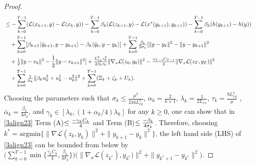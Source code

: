 \documentclass[letterpaper,11 pt]{article}
\def\ml{\mathcal L}
\newcommand{\zal}[1]{{\color{black}#1}}
\newcommand{\af}[1]{{\color{black}#1}}
\newcommand{\mb}[1]{{\color{black}#1}}
\newcommand{\az}[1]{{\color{black}#1}}
\begin{document}
\begin{proof}
\begin{align}
\nonumber&\leq -\sum_{k=0}^{T-1}(\ml(x_{k+1},y)-\ml(x_{k},y))- \sum_{k=0}^{T-1}\beta_k(\ml(z_{k+1},y)-\ml(x^\ast\zal{(y_{k+1})},y_{k+1}))- \sum_{k=0}^{T-1}\beta_k(h(y_{k+1})-h(y))\\
\nonumber&\quad +\sum_{k=0}^{T-1}[\beta_{k+1}\langle \bar q_{k+1},y-y_{k+1}\rangle-\beta_k\langle \bar q_k,y-y_k\rangle] +\sum_{k=0}^{T-1}\tfrac{\beta_k}{ 2\sigma_k}[\|y-y_k\|^2-\|y-y_{k+1}\|^2\\
\nonumber&\quad+\tfrac{1}{ 2}\|y-v_k\|^2-\frac{1}{2}\|y-v_{k+1}\|^2]+\tfrac{L_{xy}^2\gamma_0^2}{ 2\beta_0\tau_0}\|\nabla_x\ml{(z_0,y_0)}\|^2-\tfrac{\gamma_{T-1}C_{T-1}}{ 2}\|\nabla_x \ml (z_{T},y_T)\|^2\\
&\quad+\af{\sum_{k=0}^{T-1}\tfrac{1}{ \bar\alpha_k}\|\beta_ku_k^3+u_k^1-u_k^2\|^2}+\mb{\sum_{k=0}^{T-1}(\Xi_k+\zeta_k+U_k)}.
\end{align}
Choosing the parameters such that \az{$\sigma_k \leq\tfrac{\mu^2}{216L^2_{xy}}$}, $\alpha_k=\tfrac{2}{k+1}$, $\lambda_k=\tfrac{1}{2L_{xx}}$, $\tau_k=\tfrac{9L^2_{xy}}{\mu}$ , $\bar\alpha_k=\tfrac{\beta_k}{4\sigma_k}$, and $\gamma_k\in [\lambda_k,(1+\alpha_k/4)\lambda_k]$ for any $k\geq 0$, one can show that in \eqref{3align23} Term (A)$\leq{-{\gamma_k C_k}\over4}$ and Term (B)$\leq {-\beta_k\over{4\sigma_k}}$. Therefore, choosing $k^*=\mbox{argmin}\{\|\nabla \ml (z_{k},y_{k})\|^2+\|y_{k+1}-y_{k}\|^2\}$, the left hand side (LHS) of \eqref{3align23} can be bounded from below by $\big(\sum_{k=0}^{T-1} \min \{{\tfrac{{\gamma_k C_k}}{4}, \tfrac{\beta_k}{{4\sigma_k}}}\}\big)\big(\|\nabla_x \ml(z_{k^*}),y_{k^*})\|^2+\|y_{k^*+1}-y_{k^*}\|^2\big)$.

\end{proof}
\end{document}
